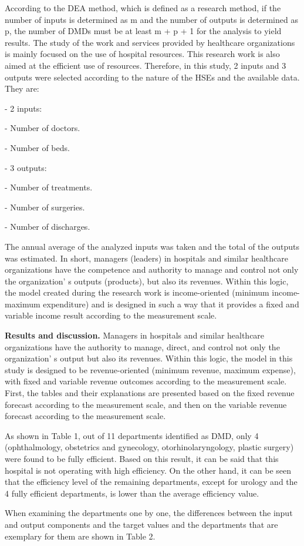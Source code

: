 \begin{multicols}{2}
According to the DEA method, which is defined as a research method, if
the number of inputs is determined as m and the number of outputs is
determined as p, the number of DMDs must be at least m + p + 1 for the
analysis to yield results. The study of the work and services provided
by healthcare organizations is mainly focused on the use of hospital
resources. This research work is also aimed at the efficient use of
resources. Therefore, in this study, 2 inputs and 3 outputs were
selected according to the nature of the HSEs and the available data.
They are:

- 2 inputs:

- Number of doctors.

- Number of beds.

- 3 outputs:

- Number of treatments.

- Number of surgeries.

- Number of discharges.

The annual average of the analyzed inputs was taken and the total of the
outputs was estimated. In short, managers (leaders) in hospitals and
similar healthcare organizations have the competence and authority to
manage and control not only the organization' s outputs
(products), but also its revenues. Within this logic, the model created
during the research work is income-oriented (minimum income-maximum
expenditure) and is designed in such a way that it provides a fixed and
variable income result according to the measurement scale.

{\bfseries Results and discussion.} Managers in hospitals and similar
healthcare organizations have the authority to manage, direct, and
control not only the organization' s output but also its
revenues. Within this logic, the model in this study is designed to be
revenue-oriented (minimum revenue, maximum expense), with fixed and
variable revenue outcomes according to the measurement scale. First, the
tables and their explanations are presented based on the fixed revenue
forecast according to the measurement scale, and then on the variable
revenue forecast according to the measurement scale.

As shown in Table 1, out of 11 departments identified as DMD, only 4
(ophthalmology, obstetrics and gynecology, otorhinolaryngology, plastic
surgery) were found to be fully efficient. Based on this result, it can
be said that this hospital is not operating with high efficiency. On the
other hand, it can be seen that the efficiency level of the remaining
departments, except for urology and the 4 fully efficient departments,
is lower than the average efficiency value.

When examining the departments one by one, the differences between the
input and output components and the target values
and the departments that are exemplary for them
are shown in Table 2.
\end{multicols}

